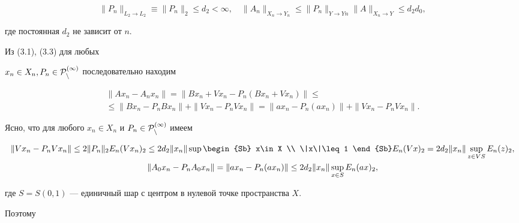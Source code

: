 \begin{equation}


\|P_n\|_{{L_2\rightarrow L_2}} \equiv \|P_n\|_2 \leq d_2<\infty,\quad


\|A_n\|_{{X_n\rightarrow Y_n}} \leq \|P_n\|_{{Y\rightarrow Yn}}


\|A\|_{{X_n\rightarrow Y}} \leq d_2d_0,


\end{equation}


где постоянная $d_2$ не зависит от $n$.





Из (3.1), (3.3) для любых


$x_n\in X_n, P_n\in \cal P_n^{(1)}$ последовательно находим 


\begin{multline}


\|Ax_n-A_nx_n\|=\|Bx_n+Vx_n-P_n(Bx_n+Vx_n)\|\leq \\


%


\le \|Bx_n-P_nBx_n\|+ 


\|Vx_n-P_nVx_n\|=\|ax_n-P_n(ax_n)\|+\|Vx_n-P_nVx_n\|.


\end{multline}





Ясно, что для любого $x_n\in X_n$ и $P_n\in \cal P_n^{(1)}$ имеем


\begin{gather*}


\|Vx_n-P_nVx_n\|\leq 2 \|P_n\|_2 E_n(Vx_n)_2 \leq


2 d_2\|x_n\|


\sup\begin{Sb} x\in X \\ \|x\|\leq 1 \end{Sb}


E_n(Vx)_2=2 d_2\|x_n\|\sup_{z\in VS} E_n(z)_2, \\


%


\|A_0x_n-P_nA_0x_n\|=\|ax_n-P_n(ax_n)\|\leq 2 d_2\|x_n\|\sup


_{x\in S} E_n(ax)_2 ,


\end{gather*}


где $S=S(0,1)$ --- единичный шар с центром в нулевой точке пространства $X$.


Поэтому


